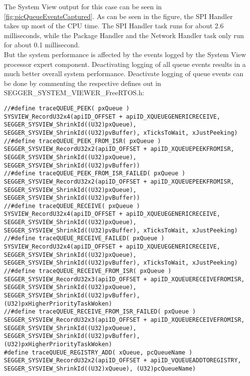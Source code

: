 The System View output for this case can be seen in \autoref{fig:picQueueEventsCaptured}. As can be seen in the figure, the SPI Handler takes up most of the CPU time. The SPI Handler task runs for about 2.6 milliseconds, while the Package Handler and the Network Handler task only run for about 0.1 millisecond.\\
But the system performance is affected by the events logged by the System View processor expert component. Deactivating logging of all queue events results in a much better overall system performance. Deactivate logging of queue events can be done by commenting the respective defines out in SEGGER\_SYSTEM\_VIEWER\_FreeRTOS.h:\\
\begin{lstlisting}
//#define traceQUEUE_PEEK( pxQueue )                                    SYSVIEW_RecordU32x4(apiID_OFFSET + apiID_XQUEUEGENERICRECEIVE, SEGGER_SYSVIEW_ShrinkId((U32)pxQueue), SEGGER_SYSVIEW_ShrinkId((U32)pvBuffer), xTicksToWait, xJustPeeking)
//#define traceQUEUE_PEEK_FROM_ISR( pxQueue )                           SEGGER_SYSVIEW_RecordU32x2(apiID_OFFSET + apiID_XQUEUEPEEKFROMISR, SEGGER_SYSVIEW_ShrinkId((U32)pxQueue), SEGGER_SYSVIEW_ShrinkId((U32)pvBuffer))
//#define traceQUEUE_PEEK_FROM_ISR_FAILED( pxQueue )                    SEGGER_SYSVIEW_RecordU32x2(apiID_OFFSET + apiID_XQUEUEPEEKFROMISR, SEGGER_SYSVIEW_ShrinkId((U32)pxQueue), SEGGER_SYSVIEW_ShrinkId((U32)pvBuffer))
//#define traceQUEUE_RECEIVE( pxQueue )                                 SYSVIEW_RecordU32x4(apiID_OFFSET + apiID_XQUEUEGENERICRECEIVE, SEGGER_SYSVIEW_ShrinkId((U32)pxQueue), SEGGER_SYSVIEW_ShrinkId((U32)pvBuffer), xTicksToWait, xJustPeeking)
//#define traceQUEUE_RECEIVE_FAILED( pxQueue )                          SYSVIEW_RecordU32x4(apiID_OFFSET + apiID_XQUEUEGENERICRECEIVE, SEGGER_SYSVIEW_ShrinkId((U32)pxQueue), SEGGER_SYSVIEW_ShrinkId((U32)pvBuffer), xTicksToWait, xJustPeeking)
//#define traceQUEUE_RECEIVE_FROM_ISR( pxQueue )                        SEGGER_SYSVIEW_RecordU32x3(apiID_OFFSET + apiID_XQUEUERECEIVEFROMISR, SEGGER_SYSVIEW_ShrinkId((U32)pxQueue), SEGGER_SYSVIEW_ShrinkId((U32)pvBuffer), (U32)pxHigherPriorityTaskWoken)
//#define traceQUEUE_RECEIVE_FROM_ISR_FAILED( pxQueue )                 SEGGER_SYSVIEW_RecordU32x3(apiID_OFFSET + apiID_XQUEUERECEIVEFROMISR, SEGGER_SYSVIEW_ShrinkId((U32)pxQueue), SEGGER_SYSVIEW_ShrinkId((U32)pvBuffer), (U32)pxHigherPriorityTaskWoken)
#define traceQUEUE_REGISTRY_ADD( xQueue, pcQueueName )                SEGGER_SYSVIEW_RecordU32x2(apiID_OFFSET + apiID_VQUEUEADDTOREGISTRY, SEGGER_SYSVIEW_ShrinkId((U32)xQueue), (U32)pcQueueName)

\end{lstlisting}
